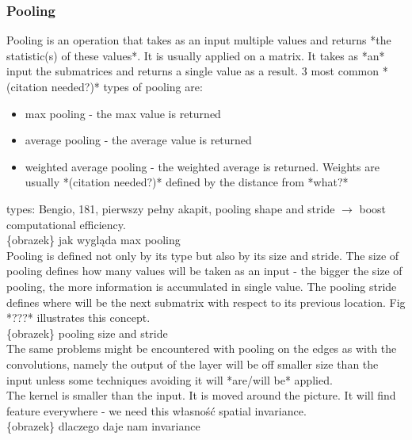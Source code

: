 \documentclass[a4paper,10pt]{report}
\begin{document}
	\subsubsection{Pooling} %
	  Pooling is an operation that takes as an input multiple values and returns *the statistic(s) of these values*. It is usually applied on a matrix. It takes as *an* input the submatrices and returns a single value as a result. 3 most common *(citation needed?)* types of pooling are:
	  \begin{itemize}
	   \item max pooling - the max value is returned
	   \item average pooling - the average value is returned
	   \item weighted average pooling - the weighted average is returned. Weights are usually *(citation needed?)* defined by the distance from *what?*
	  \end{itemize}
	  
	  types: Bengio, 181, pierwszy pełny akapit, pooling shape and stride $\rightarrow$ boost computational efficiency. \\

	  \{obrazek\} jak wygląda max pooling \\
	  
	  Pooling is defined not only by its type but also by its size and stride. The size of pooling defines how many values will be taken as an input - the bigger the size of pooling, the more information is accumulated in single value. The pooling stride defines where will be the next submatrix with respect to its previous location. Fig *???* illustrates this concept. \\
	  
	  \{obrazek\} pooling size and stride \\
	  
	  The same problems might be encountered with pooling on the edges as with the convolutions, namely the output of the layer will be off smaller size than the input unless some techniques avoiding it will *are/will be* applied.\\
	  
	   The kernel is smaller than the input. It is moved around the picture. It will find feature everywhere - we need this własność spatial invariance.\\ %
	  
	  \{obrazek\} dlaczego daje nam invariance
	
\end{document}
